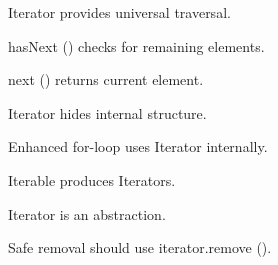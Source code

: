 \documentclass[11pt,a4paper]{book}
\begin{document}
\begin{rosettarule}

Iterator provides universal traversal.

\end{rosettarule}

\begin{rosettarule}

hasNext () checks for remaining elements.

\end{rosettarule}

\begin{rosettarule}

next () returns current element.

\end{rosettarule}

\begin{rosettarule}

Iterator hides internal structure.

\end{rosettarule}

\begin{rosettarule}

Enhanced for-loop uses Iterator internally.

\end{rosettarule}

\begin{rosettarule}

Iterable produces Iterators.

\end{rosettarule}

\begin{rosettarule}

Iterator is an abstraction.

\end{rosettarule}

\begin{rosettarule}

Safe removal should use iterator.remove ().

\end{rosettarule}



\end{document}
